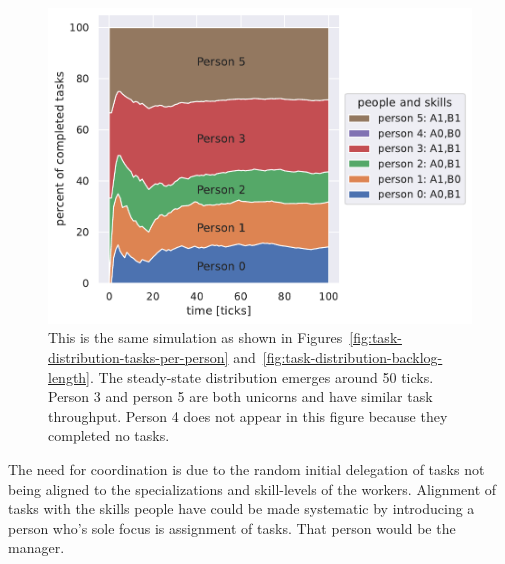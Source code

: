 \begin{figure}[H] %
\centering
\includegraphics[width=1\textwidth]{images/task_distribution_percent_of_tasks_per_person_simCount1_skills2_levels1_taskduration1_people6_social0_ticks100.pdf}
\caption{This is the same simulation as shown in Figures~\ref{fig:task-distribution-tasks-per-person} and~\ref{fig:task-distribution-backlog-length}. The steady-state distribution emerges around 50 ticks. Person 3 and person 5 are both unicorns and have similar task throughput. Person 4 does not appear in this figure because they completed no tasks.}
\label{fig:task-distribution-percent-of-tasks}
\end{figure}






The need for coordination is due to the random initial delegation of tasks not being aligned to the specializations and skill-levels of the workers. Alignment of tasks with the skills people have could be made systematic by introducing a person who's sole focus is assignment of tasks. That person would be the manager.





